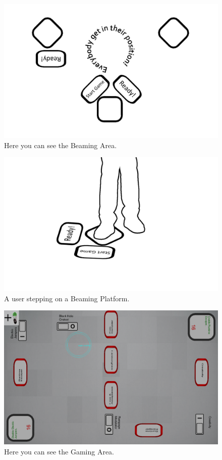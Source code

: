 \documentclass{sigchi}
\begin{document}
\begin{figure}[!h]
\centering
\includegraphics[width=0.9\columnwidth]{beamingArea}
\caption{Here you can see the Beaming Area.}
\label{fig:beamingArea}
\end{figure}
 

\begin{figure}[!h]
\centering
\includegraphics[width=0.9\columnwidth]{beamingPlatform}
\caption{A user stepping on a Beaming Platform.}
\label{fig:beamingPlatform}
\end{figure}



\begin{figure}[!h]
\centering
\includegraphics[width=0.9\columnwidth]{gamingArea}
\caption{Here you can see the Gaming Area.}
\label{fig:gamingArea}
\end{figure}
\end{document}
